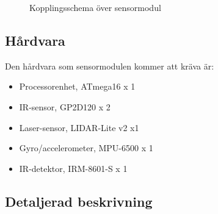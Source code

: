 \documentclass[11pt]{article}
\begin{document}
\begin{flushleft}
\begin{figure}[htbp]
\centering
\noindent{}
	\caption{Kopplingsschema över sensormodul \label{kopplingsschema:sensormodul}}	
\end{figure}
 
\subsection{Hårdvara}
Den hårdvara som sensormodulen kommer att kräva är:

\begin{itemize}
\item{Processorenhet, ATmega16 x 1}
\item{IR-sensor, GP2D120 x 2}
\item{Laser-sensor, LIDAR-Lite v2 x1}
\item{Gyro/accelerometer, MPU-6500 x 1}
\item{IR-detektor, IRM-8601-S x 1}

\end{itemize}

\subsection{Detaljerad beskrivning}


\end{flushleft}
\end{document}
